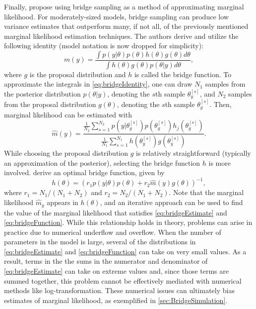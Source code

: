\documentclass[twocolumn]{article}
\begin{document}
Finally, \cite{MengWong} propose using bridge sampling as a method of approximating marginal likelihood. For moderately-sized models, bridge sampling can produce low variance estimates that outperform many, if not all, of the previously mentioned marginal likelihood estimation techniques. The authors derive and utilize the following identity (model notation is now dropped for simplicity):
\begin{equation}
	\label{eq:bridgeIdentity}
	m(y) = \frac{\int p(y|\theta)p(\theta)h(\theta)g(\theta) d\theta}{\int h(\theta)g(\theta)p(\theta|y) d\theta},
\end{equation}
where $g$ is the proposal distribution and $h$ is called the bridge function. To approximate the integrals in \cref{eq:bridgeIdentity}, one can draw $N_1$ samples from the posterior distribution $p(\theta|y)$, denoting the $s$th sample $\theta_{y}^{[s]}$, and $N_2$ samples from the proposal distribution $g(\theta)$, denoting the $s$th sample $\theta_{g}^{[s]}$. Then, marginal likelihood can be estimated with
\begin{equation}
	\label{eq:bridgeEstimate}
	\hat{m}(y) = \frac{\frac{1}{N_2}\sum_{s=1}^{N_2} p\left(y|\theta_{g}^{[s]}\right)p\left(\theta_{g}^{[s]}\right)h_j\left(\theta_{g}^{[s]}\right)}{\frac{1}{N_1}\sum_{s=1}^{N_1} h\left(\theta_{y}^{[s]}\right)g\left(\theta_{y}^{[s]}\right)}.
\end{equation}
While choosing the proposal distribution $g$ is relatively straightforward (typically an approximation of the posterior), selecting the bridge function $h$ is more involved. \cite{MengWong} derive an optimal bridge function, given by
\begin{equation}
	\label{eq:bridgeFunction}
	h(\theta) = \left(r_1 p(y|\theta) p(\theta) + r_2 \hat{m}(y) g(\theta)\right)^{-1},
\end{equation}
where $r_1 = N_1 / (N_1 + N_2)$ and $r_2 = N_2 / (N_1 + N_2)$. Note that the marginal likelihood $\hat{m}_y$ appears in $h(\theta)$, and an iterative approach can be used to find the value of the marginal likelihood that satisfies \cref{eq:bridgeEstimate} and \cref{eq:bridgeFunction}. While this relationship holds in theory, problems can arise in practice due to numerical underflow and overflow. When the number of parameters in the model is large, several of the distributions in \cref{eq:bridgeEstimate} and \cref{eq:bridgeFunction} can take on very small values. As a result, terms in the the sums in the numerator and denominator of \cref{eq:bridgeEstimate} can take on extreme values and, since those terms are summed together, this problem cannot be effectively mediated with numerical methods like log-transformation. These numerical issues can ultimately bias estimates of marginal likelihood, as exemplified in \cref{sec:BridgeSimulation}.
\end{document}
